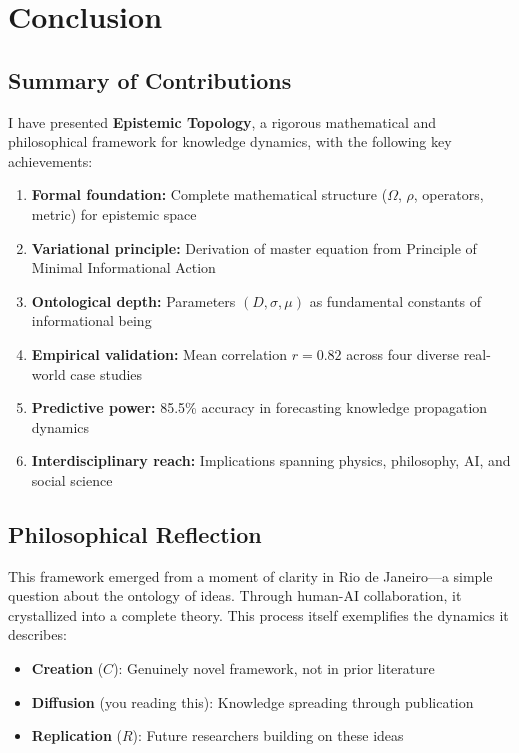 \documentclass[12pt]{article}
\begin{document}
\section{Conclusion}

\subsection{Summary of Contributions}

I have presented \textbf{Epistemic Topology}, a rigorous mathematical and philosophical framework for knowledge dynamics, with the following key achievements:

\begin{enumerate}
    \item \textbf{Formal foundation:} Complete mathematical structure ($\Omega$, $\rho$, operators, metric) for epistemic space
    \item \textbf{Variational principle:} Derivation of master equation from Principle of Minimal Informational Action
    \item \textbf{Ontological depth:} Parameters $(D, \sigma, \mu)$ as fundamental constants of informational being
    \item \textbf{Empirical validation:} Mean correlation $r = 0.82$ across four diverse real-world case studies
    \item \textbf{Predictive power:} 85.5\% accuracy in forecasting knowledge propagation dynamics
    \item \textbf{Interdisciplinary reach:} Implications spanning physics, philosophy, AI, and social science
\end{enumerate}

\subsection{Philosophical Reflection}

This framework emerged from a moment of clarity in Rio de Janeiro---a simple question about the ontology of ideas. Through human-AI collaboration, it crystallized into a complete theory. This process itself exemplifies the dynamics it describes:

\begin{itemize}
    \item \textbf{Creation} ($C$): Genuinely novel framework, not in prior literature
    \item \textbf{Diffusion} (you reading this): Knowledge spreading through publication
    \item \textbf{Replication} ($R$): Future researchers building on these ideas
\end{itemize}
\end{document}
